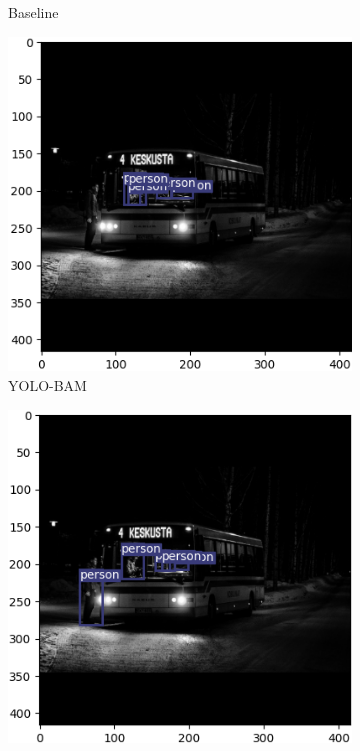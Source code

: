 \begin{figure}[!htbp]
\begin{subfigure}{.2\textwidth}
  \caption{Baseline}
  \label{fig:basebus}
\end{subfigure}%
\begin{subfigure}{.2\textwidth}
  \centering
  \includegraphics[width=\textwidth]{images/CBAM_bus.png}
  \caption{YOLO-BAM}
  \label{fig:cbambus}
\end{subfigure}%
\begin{subfigure}{.2\textwidth}
  \centering
  \includegraphics[width=\textwidth]{images/DSC_bus.png}

\end{subfigure}
\end{figure}
